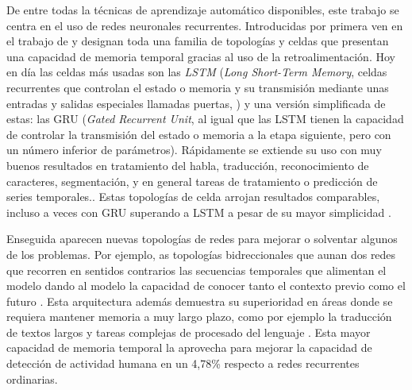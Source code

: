 De entre todas la técnicas de aprendizaje automático disponibles, este trabajo se centra en el uso de redes neuronales recurrentes. Introducidas por primera ven en el trabajo de  y designan toda una familia de topologías y celdas que presentan una capacidad de memoria temporal gracias al uso de la retroalimentación. Hoy en día las celdas más usadas son las \textit{LSTM} (\textit{Long Short-Term Memory}, celdas recurrentes que controlan el estado o memoria y su transmisión mediante unas entradas y salidas especiales llamadas puertas, ) y una versión simplificada de estas: las GRU (\textit{Gated Recurrent Unit}, al igual que las LSTM tienen la capacidad de controlar la transmisión del estado o memoria a la etapa siguiente, pero con un número inferior de parámetros). Rápidamente se extiende su uso con muy buenos resultados en tratamiento del habla, traducción, reconocimiento de caracteres, segmentación, y en general tareas de tratamiento o predicción de series temporales.. Estas topologías de celda arrojan resultados comparables, incluso a veces con GRU superando a LSTM a pesar de su mayor simplicidad \cite{Chung2014,Su2018}.

Enseguida aparecen nuevas topologías de redes para mejorar o solventar algunos de los problemas. Por ejemplo, as topologías bidreccionales que aunan dos redes que recorren en sentidos contrarios las secuencias temporales que alimentan el modelo dando al modelo la capacidad de conocer tanto el contexto previo como el futuro \cite{Schuster1997}. Esta arquitectura además demuestra su superioridad en áreas donde se requiera mantener memoria a muy largo plazo, como por ejemplo la traducción de textos largos y tareas complejas de procesado del lenguaje \cite{Su2018}. Esta mayor capacidad de memoria temporal la aprovecha  para mejorar la capacidad de detección de actividad humana en un 4,78\% respecto a redes recurrentes ordinarias.


